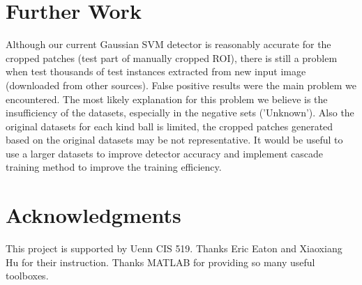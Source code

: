 \documentclass{article}
\begin{document}
\section{Further Work} 
Although our current Gaussian SVM detector is reasonably accurate for the cropped patches (test part of manually cropped ROI), there is still a problem when test thousands of test instances extracted from new input image (downloaded from other sources). False positive results were the main problem we encountered. The most likely explanation for this problem we believe is the insufficiency of the datasets, especially in the negative sets ('Unknown'). Also the original datasets for each kind ball is limited, the cropped patches generated based on the original datasets may be not representative. It would be useful to use a larger datasets to improve detector accuracy and implement cascade training method \cite{viola2001rapid} to improve the training efficiency.


\section*{Acknowledgments} 
This project is supported by Uenn CIS 519. Thanks Eric Eaton and Xiaoxiang Hu for their instruction. Thanks MATLAB for providing so many useful toolboxes.



\end{document}
